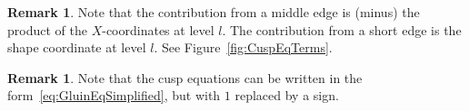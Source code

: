 \documentclass[12pt]{amsart}
\theoremstyle{definition}
\newtheorem{remark}[theorem]{Remark}
\numberwithin{equation}{section}
\def\GL{\mathrm{GL}}
\def\C{\mathbb{C}}
\begin{document}
\begin{remark}
Note that the contribution from a middle edge is (minus) the product of the $X$-coordinates at level $l$. The contribution from a short edge is the shape coordinate at level $l$. See Figure~\ref{fig:CuspEqTerms}. 
\end{remark}

\begin{remark}
Note that the cusp equations can be written in the form~\eqref{eq:GluinEqSimplified}, but with $1$ replaced by a sign.
\end{remark}





%




\end{document}
